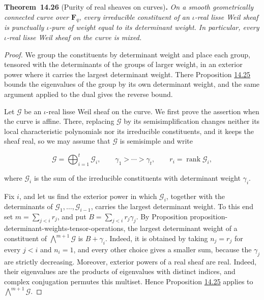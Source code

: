 \documentclass[11pt]{article}
\newenvironment{bpstatement}[2]{\par\addvspace{0.6\baselineskip}\noindent\textbf{#1}#2\textbf{.}\enspace\ignorespaces}
  {\par\addvspace{0.4\baselineskip}}
\newenvironment{bpstatementit}[2]{\begin{bpstatement}{#1}{#2}\itshape\ignorespaces}{\end{bpstatement}}
\begin{document}
\label{bp120}%
\begin{bpstatementit}{Theorem~14.26}{ (Purity of real sheaves on curves)}
On a smooth geometrically connected curve over \(\mathbf F_q\), every irreducible constituent of an \(\iota\)-real lisse Weil sheaf is punctually \(\iota\)-pure of weight equal to its determinant weight. In particular, every \(\iota\)-real lisse Weil sheaf on the curve is mixed.
\end{bpstatementit}

\begin{proof}[{Proof}]\label{bp121}%
We group the constituents by determinant weight and place each group, tensored with the determinants of the groups of larger weight, in an exterior power where it carries the largest determinant weight. There Proposition \hyperref[bp116]{14.25} bounds the eigenvalues of the group by its own determinant weight, and the same argument applied to the dual gives the reverse bound.

Let \(\mathcal G\) be an \(\iota\)-real lisse Weil sheaf on the curve. We first prove the assertion when the curve is affine. There, replacing \(\mathcal G\) by its semisimplification changes neither its local characteristic polynomials nor its irreducible constituents, and it keeps the sheaf real, so we may assume that \(\mathcal G\) is semisimple and write

\[
\mathcal G=\bigoplus_{i=1}^t\mathcal G_i,
\qquad \gamma_1>\cdots>\gamma_t,
\qquad r_i=\operatorname{rank}\mathcal G_i,
\]

where \(\mathcal G_i\) is the sum of the irreducible constituents with determinant weight \(\gamma_i\).

Fix \(i\), and let us find the exterior power in which \(\mathcal G_i\), together with the determinants of \(\mathcal G_1,\dots,\mathcal G_{i-1}\), carries the largest determinant weight. To this end set \(m=\sum_{j<i}r_j\), and put \(B=\sum_{j<i}r_j\gamma_j\).  By Proposition proposition-determinant-weights-tensor-operations, the largest determinant weight of a constituent of \(\bigwedge^{m+1}\mathcal G\) is \(B+\gamma_i\).  Indeed, it is obtained by taking \(n_j=r_j\) for every \(j<i\) and \(n_i=1\), and every other choice gives a smaller sum, because the \(\gamma_j\) are strictly decreasing.  Moreover, exterior powers of a real sheaf are real. Indeed, their eigenvalues are the products of eigenvalues with distinct indices, and complex conjugation permutes this multiset.  Hence Proposition \hyperref[bp116]{14.25} applies to \(\bigwedge^{m+1}\mathcal G\).


\end{proof}
\end{document}
